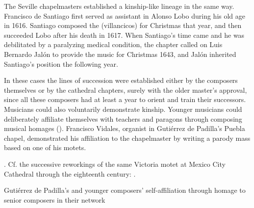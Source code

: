 
The Seville chapelmasters established a kinship-like lineage in the same way.
Francisco de Santiago first served as assistant in Alonso Lobo during his old
age in 1616.%
    \Autocites
    {Stevenson:SantiagoF}
    {Perez:DMEH-Santiago}
Santiago composed the  (villancicos) for Christmas that year,
and then succeeded Lobo after his death in 1617.
When Santiago's time came and he was debilitated by a paralyzing medical
condition, the chapter called on Luis Bernardo Jalón to provide the music for
Christmas 1643, and Jalón inherited Santiago's position the following year.


In these cases the lines of succession were established either by the composers
themselves or by the cathedral chapters, surely with the older master's
approval, since all these composers had at least a year to orient and train
their successors.
Musicians could also voluntarily demonstrate kinship.
Younger musicians could deliberately affiliate themselves with teachers and
paragons through composing musical homages ().
Francisco Vidales, organist in Gutiérrez de Padilla's Puebla chapel,
demonstrated his affiliation to the chapelmaster by writing a parody mass
based on one of his motets.%
\begin{Footnote}
    \Autocite{Koegel:Padilla}.    
    Cf. the successive reworkings of the same Victoria motet at
    Mexico City Cathedral through the eighteenth century:
    \autocite{Goldman:StileAntico}.
\end{Footnote}


{Gutiérrez de Padilla's  and younger composers' self-affiliation
through homage to senior composers in their network}

